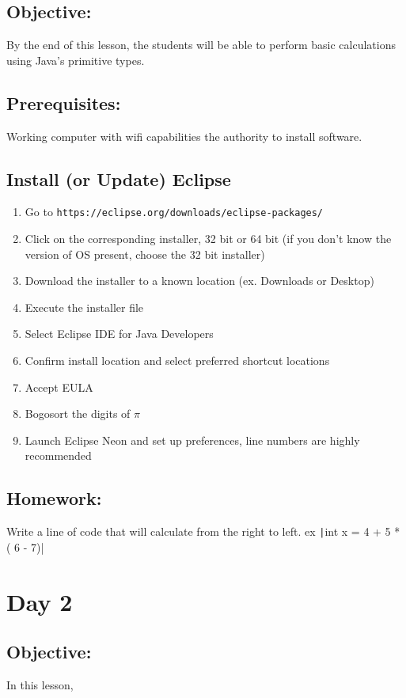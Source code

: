 \documentclass[11pt,fleqn]{article}
\newcommand{\mil}[2][java]{\texttt|#2|}
\begin{document}
\subsection*{Objective:} By the end of this lesson, the students will be able to perform basic calculations using Java's primitive types.
\subsection*{Prerequisites:} Working computer with wifi capabilities the authority to install software.
\subsection*{Install (or Update) Eclipse}
\begin{enumerate}
\item Go to \texttt{https://eclipse.org/downloads/eclipse-packages/}
\item Click on the corresponding installer, 32 bit or 64 bit (if you don't know the version of OS present, choose the 32 bit installer)
\item Download the installer to a known location (ex. Downloads or Desktop)
\item Execute the installer file
\item Select Eclipse IDE for Java Developers
\item Confirm install location and select preferred shortcut locations
\item Accept EULA
\item Bogosort the digits of $\pi$
\item Launch Eclipse Neon and set up preferences, line numbers are highly recommended
\end{enumerate}
\subsection*{Homework:} Write a line of code that will calculate from the right to left. ex \mil{int x = 4 + 5 * ( 6 - 7)}
\newpage

\section*{Day 2}
\subsection*{Objective:} In this lesson, 
\end{document}
